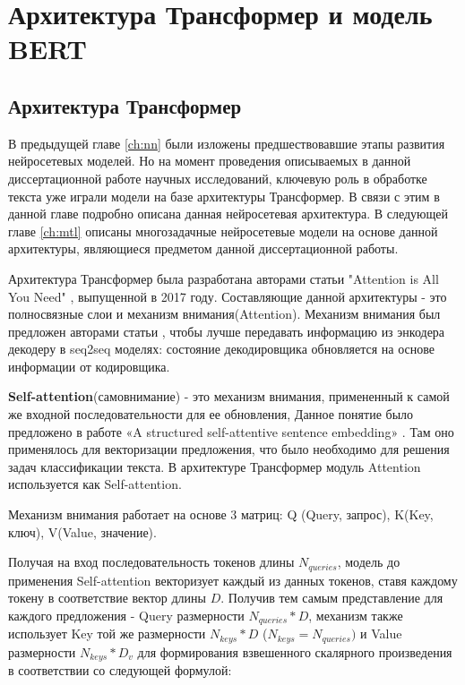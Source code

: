 \chapter{Архитектура Трансформер и модель BERT}\label{ch:tr}

\section{Архитектура Трансформер}

В предыдущей главе \ref{ch:nn} были изложены предшествовавшие этапы развития нейросетевых моделей. Но на момент проведения описываемых в данной диссертационной работе научных исследований, ключевую роль в обработке текста уже играли модели на базе архитектуры Трансформер. В связи с этим в данной главе подробно описана данная нейросетевая архитектура. В следующей главе \ref{ch:mtl} описаны многозадачные нейросетевые модели на основе данной архитектуры, являющиеся предметом данной диссертационной работы. 

Архитектура Трансформер была разработана авторами статьи "Attention is All You Need" \cite{vaswani_2017}, выпущенной в 2017 году. Составляющие данной архитектуры - это полносвязные слои и механизм внимания(Attention). Механизм внимания был предложен авторами статьи , чтобы лучше передавать информацию из энкодера декодеру в seq2seq моделях: состояние декодировщика обновляется на основе информации от кодировщика.  

\textbf{Self-attention}(самовнимание) - это механизм внимания, примененный к самой же входной последовательности для ее обновления, Данное понятие было предложено в работе «A structured self-attentive sentence embedding» \cite{lin_2017}. Там оно применялось для векторизации предложения, что было необходимо для решения задач классификации текста. В архитектуре Трансформер модуль Attention используется как Self-attention.  

Механизм внимания работает на основе 3 матриц:  Q (Query, запрос), K(Key, ключ), V(Value, значение). 

Получая на вход последовательность токенов длины $N_{queries}$, модель до применения Self-attention векторизует каждый из данных токенов, ставя каждому токену в соответствие вектор длины $D$. Получив тем самым представление для каждого предложения - Query размерности $N_{queries}*D$, механизм также использует Key той же размерности $N_{keys}*D$ ($N_{keys}= N_{queries})$ и Value размерности $N_{keys}*D_{v}$ для формирования взвешенного скалярного произведения в соответствии со следующей формулой:


